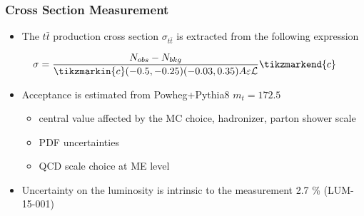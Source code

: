 \documentclass{beamer}
\begin{document}
\begin{frame}
\frametitle{Cross Section Measurement}
\begin{itemize}
\item The $t\bar{t}$ production cross section $\sigma_{t\bar{t}}$ is extracted from the following expression
\end{itemize}
\begin{equation}\label{e:barwq3}\begin{split}
\sigma=
\frac{N_{obs}-N_{bkg}}{\tikzmarkin{c}(-0.5,-0.25)(-0.03,0.35)A\varepsilon \mathcal{L}}\tikzmarkend{c}\nonumber
\tikz[remember picture] \node[coordinate] (n1) {};
\end{split}\end{equation}

\begin{itemize}
\item Acceptance is estimated from Powheg+Pythia8 $m_t=172.5$ 
\begin{itemize}
\item central value affected by the MC choice, hadronizer, parton shower scale
\item PDF uncertainties
\item QCD scale choice at ME level
\end{itemize}
\item Uncertainty on the luminosity is intrinsic to the measurement 2.7 \%
(LUM-15-001)
\end{itemize}
\end{frame}
\end{document}
